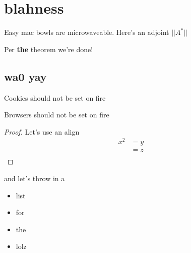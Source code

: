 \section{blahness}

\begin{theorem}
    Easy mac bowls are microwaveable. Here's an adjoint $||A^*||$
\end{theorem}

Per \textbf{the} theorem we're done!

\subsection{wa0 yay}

\begin{lemma}
    Cookies should not be set on fire
\end{lemma}

\begin{corollary}
    Browsers should not be set on fire
\end{corollary}

\begin{proof}
    Let's use an align
\begin{align}
    x^2 & = y \\
    & = z \\
\end{align}
\end{proof}

and let's throw in a 
\begin{itemize}
    \item list
    \item for 
    \item the 
    \item lolz
\end{itemize}








